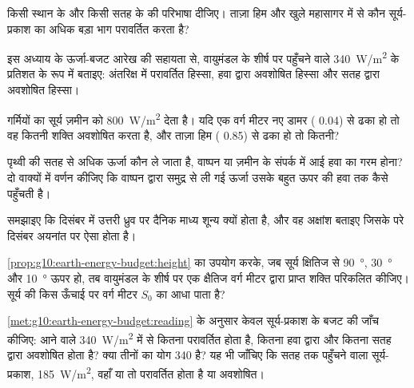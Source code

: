 \begin{exercise}[$\star$]\label{exo:g10:earth-energy-budget:1}
किसी स्थान के  और किसी सतह के  की परिभाषा दीजिए। ताज़ा हिम और खुले
महासागर में से कौन सूर्य-प्रकाश का अधिक बड़ा भाग परावर्तित करता है?
\end{exercise}

\begin{exercise}[$\star$]\label{exo:g10:earth-energy-budget:2}
इस अध्याय के ऊर्जा-बजट आरेख की सहायता से, वायुमंडल के शीर्ष पर पहुँचने वाले
\qty{340}{W/m^2} के प्रतिशत के रूप में बताइए: अंतरिक्ष में परावर्तित हिस्सा,
हवा द्वारा अवशोषित हिस्सा और सतह द्वारा अवशोषित
हिस्सा।
\end{exercise}

\begin{exercise}[$\star$]\label{exo:g10:earth-energy-budget:3}
गर्मियों का सूर्य ज़मीन को \qty{800}{W/m^2} देता है। यदि एक वर्ग मीटर
नए डामर ( 0.04) से ढका हो तो वह कितनी शक्ति अवशोषित करता है, और
ताज़ा हिम ( 0.85) से ढका हो तो कितनी?
\end{exercise}

\begin{exercise}[$\star$]\label{exo:g10:earth-energy-budget:4}
पृथ्वी की सतह से अधिक ऊर्जा कौन ले जाता है, वाष्पन या ज़मीन के संपर्क में आई हवा का गरम
होना? दो वाक्यों में वर्णन कीजिए कि वाष्पन द्वारा समुद्र से ली गई ऊर्जा उसके बहुत ऊपर की
हवा तक कैसे पहुँचती है।
\end{exercise}

\begin{exercise}[$\star$]\label{exo:g10:earth-energy-budget:5}
समझाइए कि दिसंबर में उत्तरी ध्रुव पर दैनिक माध्य  शून्य क्यों होता है, और वह
अक्षांश बताइए जिसके परे दिसंबर अयनांत पर ऐसा होता है।
\end{exercise}

\begin{exercise}[$\star\star$]\label{exo:g10:earth-energy-budget:6}
\cref{prop:g10:earth-energy-budget:height} का उपयोग करके, जब सूर्य क्षितिज से
\qty{90}{\degree}, \qty{30}{\degree} और \qty{10}{\degree} ऊपर हो, तब वायुमंडल के
शीर्ष पर एक क्षैतिज वर्ग मीटर द्वारा प्राप्त शक्ति परिकलित कीजिए।
सूर्य की किस ऊँचाई पर वर्ग मीटर $S_0$ का आधा पाता है?
\end{exercise}

\begin{exercise}[$\star\star$]\label{exo:g10:earth-energy-budget:7}
\cref{met:g10:earth-energy-budget:reading} के अनुसार केवल सूर्य-प्रकाश के बजट की
जाँच कीजिए: आने वाले \qty{340}{W/m^2} में से कितना परावर्तित होता है, कितना
हवा द्वारा और कितना सतह द्वारा अवशोषित होता है? क्या तीनों का योग 340 है?
यह भी जाँचिए कि सतह तक पहुँचने वाला सूर्य-प्रकाश, \qty{185}{W/m^2}, वहाँ या तो
परावर्तित होता है या अवशोषित।
\end{exercise}

